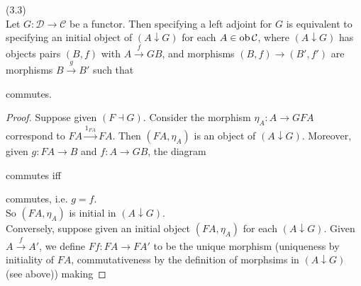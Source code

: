 \documentclass[a4paper]{article}
\begin{document}
\begin{thm} (3.3)\\
    Let $G:\mathcal{D} \to \mathcal{C}$ be a functor. Then specifying a left adjoint for $G$ is equivalent to specifying an initial object of $(A \downarrow G)$ for each $A \in \operatorname{ob} \mathcal{C}$, where $(A \downarrow G)$ has objects pairs $(B,f)$ with $A \xrightarrow{f} GB$, and morphisms $(B,f) \to (B',f')$ are morphisms $B \xrightarrow{g} B'$ such that 


    commutes.
    \begin{proof}
        Suppose given $(F \dashv G)$. Consider the morphism $\eta_A:A \to GFA$ correspond to $FA \xrightarrow{1_{FA}} FA$. Then $(FA,\eta_A)$ is an object of $(A \downarrow G)$. Moreover, given $g:FA \to B$ and $f:A \to GB$, the diagram 


        commutes iff


        commutes, i.e. $g=\hat{f}$.\\
        So $(FA,\eta_A)$ is initial in $(A \downarrow G)$.\\
        Conversely, suppose given an initial object $(FA,\eta_A)$ for each $(A \downarrow G)$. Given $A \xrightarrow{f} A'$, we define $Ff : FA \to FA'$ to be the unique morphism (uniqueness by initiality of $FA$, commutativeness by the definition of morphsims in $(A\downarrow G)$ (see above)) making 



\end{proof}
\end{thm}
\end{document}
